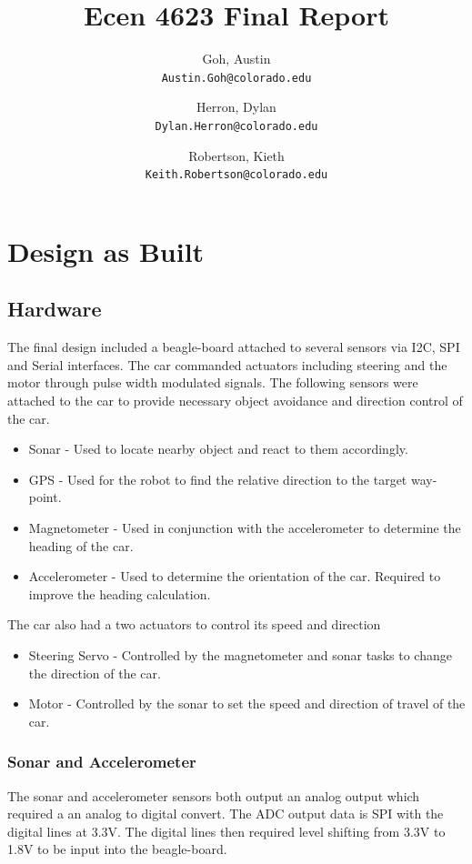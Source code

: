 \documentclass[final,letterpaper,singleside,12pt]{article}
\title{Ecen 4623 Final Report}
\author{
Goh, Austin\\
\texttt{Austin.Goh@colorado.edu}
\and
Herron, Dylan\\
\texttt{Dylan.Herron@colorado.edu}
\and
Robertson, Kieth\\
\texttt{Keith.Robertson@colorado.edu}
}
\begin{document}
\maketitle
\pagebreak
\tableofcontents
\pagebreak
\section{Design as Built} %
\label{sec:design_as_built}
\subsection{Hardware} %
\label{sub:hardware}
The final design included a beagle-board attached to several sensors via I2C, SPI and Serial interfaces. The car commanded actuators including steering and the motor through pulse width modulated signals. The following sensors were attached to the car to provide necessary object avoidance and direction control of the car.
\begin{itemize}
	\item Sonar - Used to locate nearby object and react to them accordingly.
	\item GPS - Used for the robot to find the relative direction to the target way-point.
	\item Magnetometer - Used in conjunction with the accelerometer to determine the heading of the car.
	\item Accelerometer - Used to determine the orientation of the car. Required to improve the heading calculation.
\end{itemize}
The car also had a two actuators to control its speed and direction
\begin{itemize}
	\item Steering Servo - Controlled by the magnetometer and sonar tasks to change the direction of the car.
	\item Motor - Controlled by the sonar to set the speed and direction of travel of the car.
\end{itemize}
\subsubsection{Sonar and Accelerometer} %
\label{ssub:sonar}
The sonar and accelerometer sensors both output an analog output which required a an analog to digital convert. The ADC output data is SPI with the digital lines at 3.3V. The digital lines then required level shifting from 3.3V to 1.8V to be input into the beagle-board. 
\end{document}
